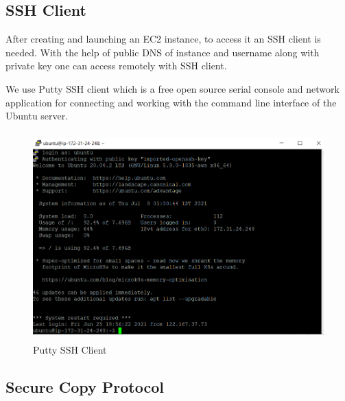 \documentclass[12 pt]{report}
\begin{document}
 \subsection{SSH Client}
    After creating and launching an EC2 instance, to access it an SSH client is needed. With the help of public DNS of instance and username along with private key one can access remotely with SSH client.
    \par
    We use Putty SSH client which is a free open source serial console and network application for connecting and working with the command line interface of the Ubuntu server.
    
    \begin{figure}[h!]
     \centering
\includegraphics[width=12cm,height =8cm,frame]{images/putty.png}
\caption{ Putty SSH Client}
\label{fig:Connecting to server via SSH client}
\end{figure}
\newpage
  
  \subsection{Secure Copy Protocol}
\end{document}
